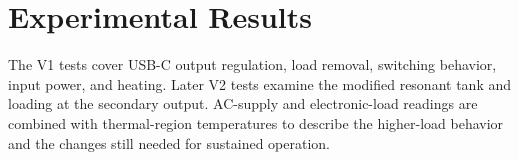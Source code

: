\chapter{Experimental Results}
\label{ch:results}

The V1 tests cover USB-C output regulation, load removal, switching behavior,
input power, and heating. Later V2 tests examine the modified resonant tank
and loading at the secondary output. AC-supply and electronic-load readings
are combined with thermal-region temperatures to describe the higher-load
behavior and the changes still needed for sustained operation.

















